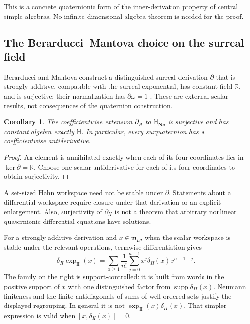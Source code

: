 \documentclass[11pt,letterpaper]{article}
\newtheorem{corollary}[theorem]{Corollary}
\theoremstyle{definition}
\newcommand{\No}{\mathbf{No}}
\newcommand{\R}{\mathbb R}
\newcommand{\HH}{\mathbb H}
\newcommand{\SQ}{\mathbb H_{\No}}
\newcommand{\mm}{\mathfrak m}
\DeclareMathOperator{\supp}{supp}
\newcommand{\exph}{\operatorname{exp}_{\mathrm H}}
\begin{document}
This is a concrete quaternionic form of the inner-derivation property of
central simple algebras. No infinite-dimensional algebra theorem is needed
for the proof.

\subsection{The Berarducci--Mantova choice on the surreal field}
Berarducci and Mantova construct a distinguished surreal derivation $\partial$
that is strongly additive, compatible with the surreal exponential, has
constant field $\R$, and is surjective; their normalization has
$\partial\omega=1$ \cite[Theorems A and B]{bm}. These are external scalar
results, not consequences of the quaternion construction.

\begin{corollary}
The coefficientwise extension $\partial_H$ to $\SQ$ is surjective and has
constant algebra exactly $\HH$. In particular, every surquaternion has a
coefficientwise antiderivative.
\end{corollary}
\begin{proof}
An element is annihilated exactly when each of its four coordinates lies in
$\ker\partial=\R$. Choose one scalar antiderivative for each of its four
coordinates to obtain surjectivity.
\end{proof}

A set-sized Hahn workspace need not be stable under $\partial$. Statements
about a differential workspace require closure under that derivation or an
explicit enlargement. Also, surjectivity of $\partial_H$ is not a theorem
that arbitrary nonlinear quaternionic differential equations have solutions.

For a strongly additive derivation and $x\in\mm_D$, when the scalar
workspace is stable under the relevant operations, termwise differentiation
gives
\begin{equation}
 \delta_H\exph(x)=
 \sum_{n\geq1}\frac1{n!}\sum_{j=0}^{n-1}
    x^j\delta_H(x)x^{n-1-j}.
 \label{eq:derivative-exp-noncomm}
\end{equation}
The family on the right is support-controlled: it is built from words in the
positive support of $x$ with one distinguished factor from
$\supp\delta_H(x)$. Neumann finiteness and the finite antidiagonals of sums
of well-ordered sets justify the displayed regrouping. In general it is not
$\exph(x)\delta_H(x)$. That simpler expression is valid when
$[x,\delta_H(x)]=0$.
\end{document}
